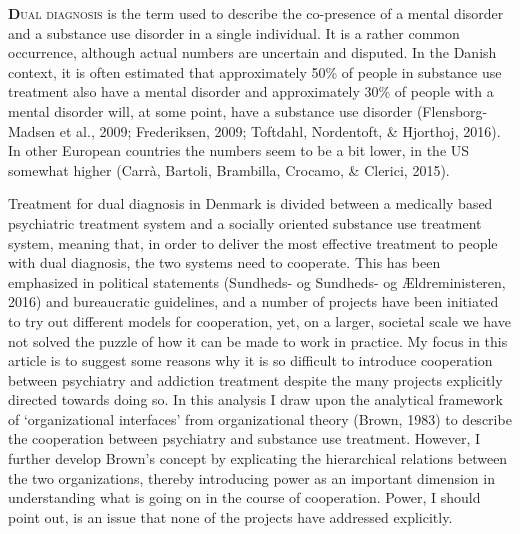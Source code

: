     \begin{multicols}{2}

\lettrine[lines=2]{\bfseries\color{black}D}{ual diagnosis} is the term used to describe the co-presence of a mental disorder and a substance use disorder in a single individual. It is a rather common occurrence, although actual numbers are uncertain and disputed. In the Danish context, it is often estimated that approximately 50\% of people in substance use treatment also have a mental disorder and approximately 30\% of people with a mental disorder will, at some point, have a substance use disorder (Flensborg-Madsen et al., 2009; Frederiksen, 2009; Toftdahl, Nordentoft, \& Hjorthoj, 2016). In other European countries the numbers seem to be a bit lower, in the US somewhat higher (Carrà, Bartoli, Brambilla, Crocamo, \& Clerici, 2015).
\par
Treatment for dual diagnosis in Denmark is divided between a medically based psychiatric treatment system and a socially oriented substance use treatment system, meaning that, in order to deliver the most effective treatment to people with dual diagnosis, the two systems need to cooperate.%
This has been emphasized in political statements (Sundheds- og Sundheds- og Ældreministeren, 2016) and bureaucratic guidelines, and a number of projects have been initiated to try out different models for cooperation, yet, on a larger, societal scale we have not solved the puzzle of how it can be made to work in practice. My focus in this article is to suggest some reasons why it is so difficult to introduce cooperation between psychiatry and addiction treatment despite the many projects explicitly directed towards doing so. In this analysis I draw upon the analytical framework of ‘organizational interfaces’ from organizational theory (Brown, 1983) to describe the cooperation between psychiatry and substance use treatment. However, I further develop Brown’s concept by explicating the hierarchical relations between the two organizations, thereby introducing power as an important dimension in understanding what is going on in the course of cooperation. Power, I should point out, is an issue that none of the projects have addressed explicitly.

\end{multicols}
